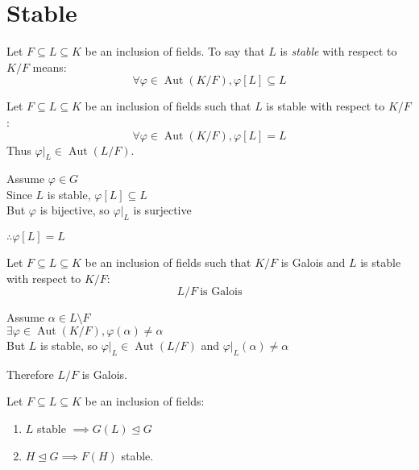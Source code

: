 \documentclass[letterpaper,12pt,fleqn]{article}
\newcommand{\p}{\varphi}
\renewcommand{\a}{\alpha}
\newcommand{\n}{\trianglelefteq}
\newcommand{\rest}[2]{\left.#1\right|_{#2}}
\DeclareMathOperator{\Aut}{Aut}
\begin{document}
\section*{Stable}

\begin{definition}[Stable]
  Let $F\subseteq L\subseteq K$ be an inclusion of fields. To say that $L$ is
  \emph{stable} with respect to $K/F$ means:
  \[\forall\p\in\Aut(K/F),\p[L]\subseteq L\]
\end{definition}

\begin{theorem}
  Let $F\subseteq L\subseteq K$ be an inclusion of fields such that $L$ is stable with
  respect to $K/F$:
  \[\forall\p\in\Aut(K/F),\p[L]=L\]
  Thus $\rest{\p}{L}\in\Aut(L/F)$.
\end{theorem}

\begin{theproof}
  Assume $\p\in G$ \\
  Since $L$ is stable, $\p[L]\subseteq L$ \\
  But $\p$ is bijective, so $\rest{\p}{L}$ is surjective

  $\therefore\p[L]=L$
\end{theproof}

\begin{theorem}
  Let $F\subseteq L\subseteq K$ be an inclusion of fields such that $K/F$ is Galois and
  $L$ is stable with respect to $K/F$:
  \[L/F\ \mbox{is Galois}\]
\end{theorem}

\begin{theorem}
  Assume $\a\in L\setminus F$ \\
  $\exists\p\in\Aut(K/F),\p(\a)\ne\a$ \\
  But $L$ is stable, so $\rest{\p}{L}\in\Aut(L/F)$ and $\rest{\p}{L}(\a)\ne\a$

  Therefore $L/F$ is Galois.
\end{theorem}

\begin{theorem}
  Let $F\subseteq L\subseteq K$ be an inclusion of fields:
  \begin{enumerate}
  \item $L$ stable $\implies G(L)\n G$
  \item $H\n G \implies F(H)$ stable.
  \end{enumerate}
\end{theorem}

\newpage
\end{document}
